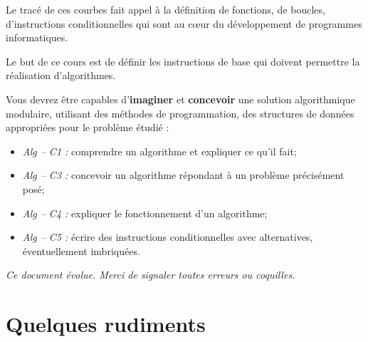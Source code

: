 \documentclass[10pt]{article}
\begin{document}
\vspace{.5cm}






Le tracé de ces courbes fait appel à la définition de fonctions, de boucles, d'instructions conditionnelles qui sont au c\oe{}ur du développement de programmes informatiques. 

Le but de ce cours est de définir les instructions de base qui doivent permettre la réalisation d'algorithmes. 

\begin{comp}
Vous devrez être capables d'\textbf{imaginer} et \textbf{concevoir} une solution algorithmique modulaire, utilisant des méthodes de programmation, des structures de données appropriées pour le problème étudié :
\begin{itemize}
\item \textit{Alg -- C1 :} comprendre un algorithme et expliquer ce qu’il fait;
\item \textit{Alg -- C3 :} concevoir un algorithme répondant à un problème précisément posé;
\item \textit{Alg -- C4 :} expliquer le fonctionnement d’un algorithme;
\item \textit{Alg -- C5 :} écrire des instructions conditionnelles avec alternatives, éventuellement imbriquées.
\end{itemize}
\end{comp}
 

\setlength{\parskip}{0ex plus 0.2ex minus 0ex}
 \renewcommand{\contentsname}{}
 \renewcommand{\baselinestretch}{1}

\tableofcontents

 \renewcommand{\baselinestretch}{1.2}
\setlength{\parskip}{2ex plus 0.5ex minus 0.2ex}

\textit{Ce document évolue. Merci de signaler toutes erreurs ou coquilles.}


\section{Quelques rudiments}
\end{document}
